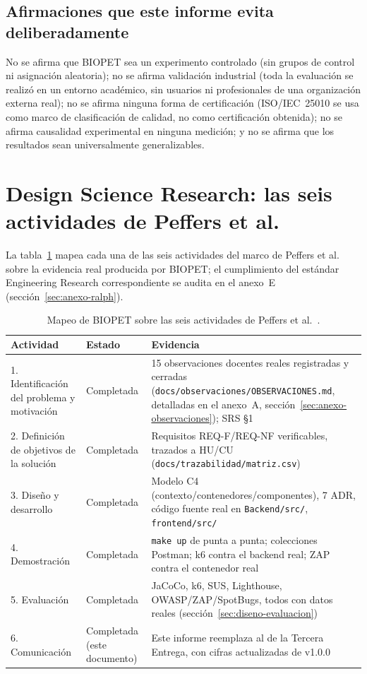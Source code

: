 \subsection*{Afirmaciones que este informe evita deliberadamente}
No se afirma que BIOPET sea un experimento controlado (sin grupos de
control ni asignaci\'on aleatoria); no se afirma validaci\'on industrial
(toda la evaluaci\'on se realiz\'o en un entorno acad\'emico, sin usuarios
ni profesionales de una organizaci\'on externa real); no se afirma ninguna
forma de certificaci\'on (ISO/IEC~25010 se usa como marco de
clasificaci\'on de calidad, no como certificaci\'on obtenida); no se afirma
causalidad experimental en ninguna medici\'on; y no se afirma que los
resultados sean universalmente generalizables.

\section{Design Science Research: las seis actividades de Peffers et al.}
\label{sec:dsr-peffers}

La tabla~\ref{tab:peffers} mapea cada una de las seis actividades del
marco de Peffers et al.~\cite{peffers2007dsrm} sobre la evidencia real
producida por BIOPET; el cumplimiento del est\'andar Engineering Research
correspondiente se audita en el anexo~E
(secci\'on~\ref{sec:anexo-ralph}).

\begin{table}[H]
  \centering
  \small
  \caption{Mapeo de BIOPET sobre las seis actividades de Peffers et al.~\cite{peffers2007dsrm}.}
  \label{tab:peffers}
  \begin{tabular}{@{}p{3.2cm}p{2.0cm}p{7.4cm}@{}}
    \toprule
    Actividad & Estado & Evidencia \\
    \midrule
    1. Identificaci\'on del problema y motivaci\'on & Completada & 15 observaciones docentes reales registradas y cerradas (\texttt{docs/observaciones/OBSERVACIONES.md}, detalladas en el anexo~A, secci\'on~\ref{sec:anexo-observaciones}); SRS \S1 \\
    2. Definici\'on de objetivos de la soluci\'on & Completada & Requisitos REQ-F/REQ-NF verificables, trazados a HU/CU (\texttt{docs/trazabilidad/matriz.csv}) \\
    3. Dise\~no y desarrollo & Completada & Modelo C4 (contexto/contenedores/componentes), 7 ADR, c\'odigo fuente real en \texttt{Backend/src/}, \texttt{frontend/src/} \\
    4. Demostraci\'on & Completada & \texttt{make up} de punta a punta; colecciones Postman; k6 contra el backend real; ZAP contra el contenedor real \\
    5. Evaluaci\'on & Completada & JaCoCo, k6, SUS, Lighthouse, OWASP/ZAP/SpotBugs, todos con datos reales (secci\'on~\ref{sec:diseno-evaluacion}) \\
    6. Comunicaci\'on & Completada (este documento) & Este informe reemplaza al de la Tercera Entrega, con cifras actualizadas de v1.0.0 \\
    \bottomrule
  \end{tabular}
\end{table}

